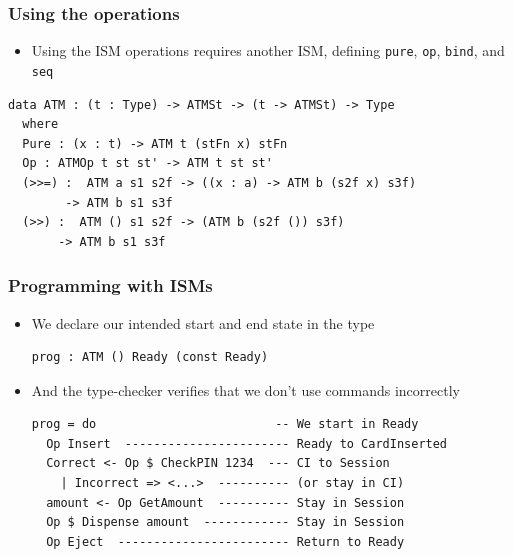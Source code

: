 \documentclass[compress,handout]{beamer}
\begin{document}
\begin{frame}[fragile]
  \frametitle{Using the operations}

  \begin{itemize}
    \item<1-> Using the ISM operations requires another ISM, defining
              \texttt{pure}, \texttt{op},
              \texttt{bind}, and \texttt{seq}
  \end{itemize}

  \pause

  \begin{verbatim}
data ATM : (t : Type) -> ATMSt -> (t -> ATMSt) -> Type
  where
  Pure : (x : t) -> ATM t (stFn x) stFn
  Op : ATMOp t st st' -> ATM t st st'
  (>>=) :  ATM a s1 s2f -> ((x : a) -> ATM b (s2f x) s3f)
        -> ATM b s1 s3f
  (>>) :  ATM () s1 s2f -> (ATM b (s2f ()) s3f)
       -> ATM b s1 s3f
  \end{verbatim}
\end{frame}


\begin{frame}[fragile]
  \frametitle{Programming with ISMs}

  \begin{itemize}
    \item<1-> We declare our intended start and end state in the type
              \begin{verbatim}
prog : ATM () Ready (const Ready)
              \end{verbatim}
    \item<2-> And the type-checker verifies that we don't use commands
              incorrectly
              \begin{verbatim}
prog = do                         -- We start in Ready
  Op Insert  ----------------------- Ready to CardInserted
  Correct <- Op $ CheckPIN 1234  --- CI to Session
    | Incorrect => <...>  ---------- (or stay in CI)
  amount <- Op GetAmount  ---------- Stay in Session
  Op $ Dispense amount  ------------ Stay in Session
  Op Eject  ------------------------ Return to Ready
              \end{verbatim}
  \end{itemize}

\end{frame}
\end{document}
